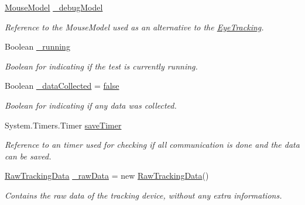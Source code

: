 \begin{DoxyCompactItemize}
\hyperlink{class_web_analyzer_1_1_test_1_1_communication_1_1_mouse_model}{Mouse\+Model} \hyperlink{class_web_analyzer_1_1_controller_1_1_test_controller_a1c615e40201210940f07312bcc993ef5}{\+\_\+debug\+Model}
\begin{DoxyCompactList}\small\item\em Reference to the Mouse\+Model used as an alternative to the \hyperlink{namespace_web_analyzer_1_1_eye_tracking}{Eye\+Tracking}. \end{DoxyCompactList}\item 
Boolean \hyperlink{class_web_analyzer_1_1_controller_1_1_test_controller_a49aaaa975ccbeedcd52fb03288cea3ef}{\+\_\+running}
\begin{DoxyCompactList}\small\item\em Boolean for indicating if the test is currently running. \end{DoxyCompactList}\item 
Boolean \hyperlink{class_web_analyzer_1_1_controller_1_1_test_controller_a7d63bbfba4672d52414c318b397c504b}{\+\_\+data\+Collected} = \hyperlink{_u_i_2_h_t_m_l_resources_2js_2src_2export_8js_ae6c865df784842196d411c1466b01686}{false}
\begin{DoxyCompactList}\small\item\em Boolean for indicating if any data was collected. \end{DoxyCompactList}\item 
System.\+Timers.\+Timer \hyperlink{class_web_analyzer_1_1_controller_1_1_test_controller_a484747e48ceb23e931111018ed87d8e1}{save\+Timer}
\begin{DoxyCompactList}\small\item\em Reference to an timer used for checking if all communication is done and the data can be saved. \end{DoxyCompactList}\item 
\hyperlink{class_web_analyzer_1_1_models_1_1_base_1_1_raw_tracking_data}{Raw\+Tracking\+Data} \hyperlink{class_web_analyzer_1_1_controller_1_1_test_controller_ac2155d50816dddd7e62689655d3a978f}{\+\_\+raw\+Data} = new \hyperlink{class_web_analyzer_1_1_models_1_1_base_1_1_raw_tracking_data}{Raw\+Tracking\+Data}()
\begin{DoxyCompactList}\small\item\em Contains the raw data of the tracking device, without any extra informations. \end{DoxyCompactList}\end{DoxyCompactItemize}


